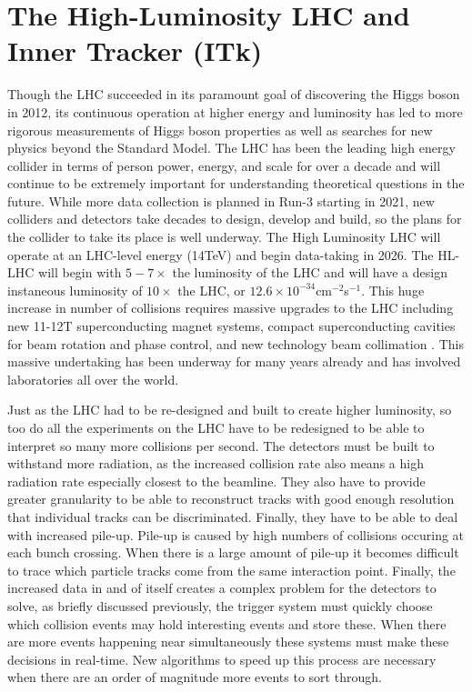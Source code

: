 \section{The High-Luminosity LHC and Inner Tracker (ITk)}
Though the LHC succeeded in its paramount goal of discovering the Higgs boson in 2012, its continuous operation at higher energy and luminosity has led to more rigorous measurements of Higgs boson properties as well as searches for new physics beyond the Standard Model. The LHC has been the leading high energy collider in terms of person power, energy, and scale for over a decade and will continue to be extremely important for understanding theoretical questions in the future. While more data collection is planned in Run-3 starting in 2021, new colliders and detectors take decades to design, develop and build, so the plans for the collider to take its place is well underway. The High Luminosity LHC will operate at an LHC-level energy (14TeV) and begin data-taking in 2026. The HL-LHC will begin with $5-7\times$ the luminosity of the LHC and will have a design instaneous luminosity of $10\times$ the LHC, or $12.6\times10^{-34}$cm$^{-2}$s$^{-1}$. This huge increase in number of collisions requires massive upgrades to the LHC including new 11-12T superconducting magnet systems, compact superconducting cavities for beam rotation and phase control, and new technology beam collimation \cite{HL-LHC Yellow Paper}. This massive undertaking has been underway for many years already and has involved laboratories all over the world.

Just as the LHC had to be re-designed and built to create higher luminosity, so too do all the experiments on the LHC have to be redesigned to be able to interpret so many more collisions per second. The detectors must be built to withstand more radiation, as the increased collision rate also means a high radiation rate especially closest to the beamline. They also have to provide greater granularity to be able to reconstruct tracks with good enough resolution that individual tracks can be discriminated. Finally, they have to be able to deal with increased pile-up. Pile-up is caused by high numbers of collisions occuring at each bunch crossing. When there is a large amount of pile-up it becomes difficult to trace which particle tracks come from the same interaction point. Finally, the increased data in and of itself creates a complex problem for the detectors to solve, as briefly discussed previously, the trigger system must quickly choose which collision events may hold interesting events and store these. When there are more events happening near simultaneously these systems must make these decisions in real-time. New algorithms to speed up this process are necessary when there are an order of magnitude more events to sort through.

